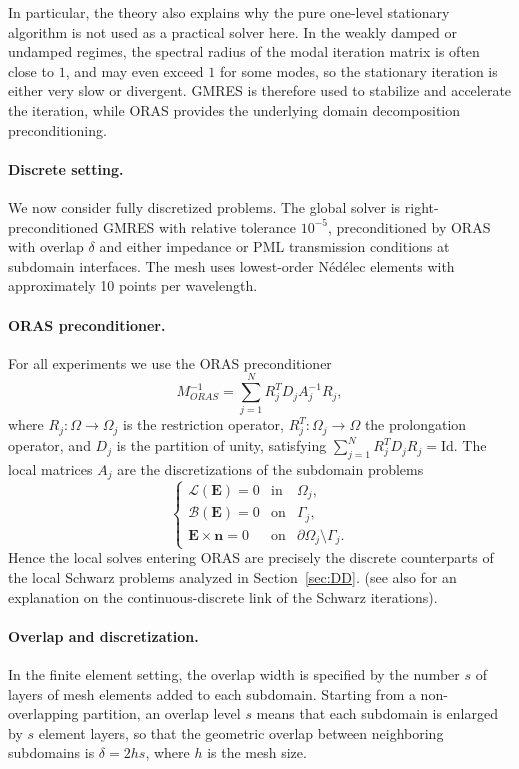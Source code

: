 \documentclass[smallextended]{svjour3}       %
\begin{document}
In particular, the theory also explains why the pure one-level stationary algorithm is not used as
a practical solver here. In the weakly damped or undamped regimes, the spectral radius of the modal
iteration matrix is often close to \(1\), and may even exceed \(1\) for some modes, so the
stationary iteration is either very slow or divergent. GMRES is therefore used to stabilize and
accelerate the iteration, while ORAS provides the underlying domain decomposition preconditioning.

\paragraph{Discrete setting.}
We now consider fully discretized problems. The global solver is right-preconditioned GMRES with
relative tolerance \(10^{-5}\), preconditioned by ORAS with overlap \(\delta\) and either impedance or
PML transmission conditions at subdomain interfaces. The mesh uses lowest-order N\'ed\'elec
elements with approximately 10 points per wavelength.

\paragraph{ORAS preconditioner.}
For all experiments we use the ORAS preconditioner
\[
M_{ORAS}^{-1}= \sum_{j=1}^{N} R_j^T D_j A_j^{-1} R_j,
\]
where \(R_j:\Omega\to\Omega_j\) is the restriction operator, \(R_j^T:\Omega_j\to\Omega\) the
prolongation operator, and \(D_j\) is the partition of unity, satisfying
\(
\sum_{j=1}^{N} R_j^T D_j R_j = \text{Id}.
\)
The local matrices \(A_j\) are the discretizations of the subdomain problems
\begin{equation}\label{pb:Schwarz-DD}
	\left\{\begin{array}{lcl}
		\mathcal{L} (\mathbf{E}) = 0 & \text{in} & \Omega_j,\\
		\mathcal{B}(\mathbf{E}) = 0 & \text{on} & \Gamma_{j},\\
		\mathbf{E} \times \mathbf{n} = 0 & \text{on} & \partial \Omega_j \setminus \Gamma_{j}.
	\end{array}\right.
\end{equation}
Hence the local solves entering ORAS are precisely the discrete counterparts of the local Schwarz
problems analyzed in Section~\ref{sec:DD}. (see also \cite{StCyr:2007:OMA} for an explanation on the continuous-discrete link of the Schwarz iterations). 

\paragraph{Overlap and discretization.}
In the finite element setting, the overlap width is specified by the number \(s\) of layers of mesh
elements added to each subdomain. Starting from a non-overlapping partition, an overlap level
\(s\) means that each subdomain is enlarged by \(s\) element layers, so that the geometric overlap
between neighboring subdomains is \(\delta = 2hs\), where \(h\) is the mesh size.
\end{document}
